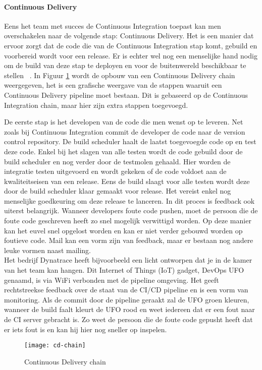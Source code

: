         \paragraph{Continuous Delivery}
        Eens het team met succes de Continuous Integration toepast kan men overschakelen naar de volgende stap: Continuous Delivery.
        Het is een manier dat ervoor zorgt dat de code die van de Continuous Integration stap komt, gebuild en voorbereid wordt voor een release.
        Er is echter wel nog een menselijke hand nodig om de build van deze stap te deployen en voor de buitenwereld beschikbaar te stellen ~\autocite{Fowler2013}.
        \newline{}In Figuur \ref{img-cd-chain} wordt de opbouw van een Continuous Delivery chain weergegeven, het is een grafische weergave van de stappen waaruit een Continuous Delivery pipeline moet bestaan. Dit is gebaseerd op de Continuous Integration chain, maar hier zijn extra stappen toegevoegd.
        
        De eerste stap is het developen van de code die men wenst op te leveren. Net zoals bij Continuous Integration commit de developer de code naar de version control repository. De build scheduler haalt de laatst toegevoegde code op en test deze code. Enkel bij het slagen van alle testen wordt de code gebuild door de build scheduler en nog verder door de testmolen gehaald. Hier worden de integratie testen uitgevoerd en wordt gekeken of de code voldoet aan de kwaliteitseisen van een release. Eens de build slaagt voor alle testen wordt deze door de build scheduler klaar gemaakt voor release. Het vereist enkel nog menselijke goedkeuring om deze release te lanceren.
        \newline{}In dit proces is feedback ook uiterst belangrijk. Wanneer developers foute code pushen, moet de persoon die de foute code geschreven heeft zo snel mogelijk verwittigd worden. Op deze manier kan het euvel snel opgelost worden en kan er niet verder gebouwd worden op foutieve code.
        Mail kan een vorm zijn van feedback, maar er bestaan nog andere leuke vormen naast mailing.\\
        Het bedrijf Dynatrace heeft bijvoorbeeld een licht ontworpen dat je in de kamer van het team kan hangen. Dit Internet of Things (IoT) gadget, DevOps UFO genaamd, is via WiFi verbonden met de pipeline omgeving. Het geeft rechtstreekse feedback over de staat van de CI/CD pipeline en is een vorm van monitoring. Als de commit door de pipeline geraakt zal de UFO groen kleuren, wanneer de build faalt kleurt de UFO rood en weet iedereen dat er een fout naar de CI server gebracht is. Zo weet de persoon die de foute code gepusht heeft dat er iets fout is en kan hij hier nog sneller op inspelen. 
        \begin{figure}	
            \texttt{[image: cd-chain]}
            \caption{Continuous Delivery chain ~\autocite{Riti2018}} \label{img-cd-chain}
        \end{figure}
        
